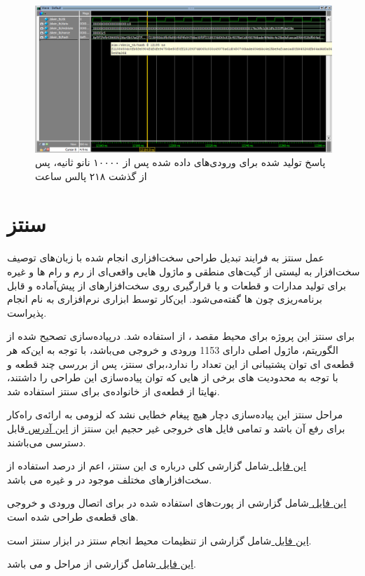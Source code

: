 \begin{figure}[H]
	\centering
	\includegraphics[width=16cm]{../RunData/sim_part3.png}	
	\caption{
		پاسخ تولید شده برای ورودی‌های داده شده پس از ۱۰۰۰۰ نانو ثانیه، پس از گذشت ۲۱۸ پالس ساعت
	}
\end{figure}

\pagebreak

\section{سنتز}
عمل سنتز به فرایند تبدیل طراحی سخت‌افزاری انجام شده با زبان‌های توصیف سخت‌افزار به لیستی از گیت‌های منطقی و ماژول هایی واقعی‌ای از رم‌ و رام ها و غیره برای تولید مدارات و قطعات   و یا قرارگیری روی سخت‌افزار‌های از پیش‌آماده و قابل برنامه‌ریزی چون ‌ها گفته‌می‌شود. این‌کار توسط ابزاری نرم‌افزاری به نام 
انجام پذیر‌است.

برای سنتز این پروژه برای محیط مقصد
، از
استفاده شد. درپیاده‌سازی تصحیح شده از الگوریتم، ماژول اصلی دارای 1153 
 ورودی و خروجی می‌باشد، با توجه به این‌که هر قطعه‌ی  ای توان پشتیبانی از این تعداد
 را ندارد،برای سنتز، پس از بررسی چند قطعه و با توجه به محدودیت های 
برخی از 
هایی که توان پیاده‌سازی این طراحی را داشتند، نهایتا از قطعه‌ی  از خانواده‌ی 
برای سنتز استفاده شد.

مراحل سنتز این پیاده‌سازی دچار هیچ پیغام خطایی نشد که لزومی به ارائه‌ی راه‌کار برای رفع آن باشد و تمامی فایل های خروجی غیر حجیم این سنتز از
\href{https://github.com/VahidZee/SkeinHashingHDL/blob/master/SynthesisFiles/}{
	 این آدرس
} 
قابل دسترسی می‌باشند.


\href{https://github.com/VahidZee/SkeinHashingHDL/blob/master/SynthesisFiles/report_summery.html}{
	این فایل
} 
شامل گزارشی کلی درباره ی این سنتز، اعم از درصد استفاده از سخت‌افزار‌های مختلف موجود در 
و غیره می باشد.

\href{https://github.com/VahidZee/SkeinHashingHDL/blob/master/SynthesisFiles/report_pinout.html}{
	این فایل
} 
شامل گزارشی از پورت‌های استفاده شده در 
برای اتصال ورودی و خروجی های قطعه‌ی طراحی شده است.

\href{https://github.com/VahidZee/SkeinHashingHDL/blob/master/SynthesisFiles/envsettings.html}{
	این فایل
} 
شامل گزارشی از تنظیمات محیط انجام سنتز در ابزار سنتز است.

\href{https://github.com/VahidZee/SkeinHashingHDL/blob/master/SynthesisFiles/report_pad.txt}{
	این فایل
} 
شامل گزارشی از مراحل 
و
می باشد.


